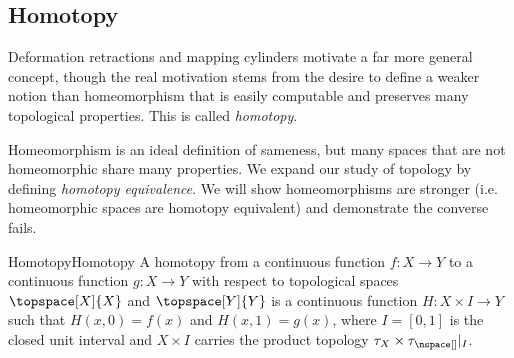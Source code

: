 \documentclass{book}                                                           %
\begin{document}
            \subsection{Homotopy}
                Deformation retractions and mapping cylinders motivate a far
                more general concept, though the real motivation stems from the
                desire to define a weaker notion than homeomorphism that is
                easily computable and preserves many topological properties.
                This is called \textit{homotopy}.
                \par\hfill\par
                \begin{minipage}{0.50\textwidth}
                    Homeomorphism is an ideal definition of sameness, but many
                    spaces that are not homeomorphic share many properties. We
                    expand our study of topology by defining
                    \textit{homotopy equivalence}. We will show homeomorphisms
                    are stronger (i.e. homeomorphic spaces are homotopy
                    equivalent) and demonstrate the converse fails.
                \end{minipage}
                \hfill
                \par\vspace{2.5ex}
                \begin{fdefinition}{Homotopy}{Homotopy}
                    A homotopy from a continuous function $f:X\rightarrow{Y}$ to
                    a continuous function $g:X\rightarrow{Y}$ with respect to
                    topological spaces $\topspace[X]{X}$ and $\topspace[Y]{Y}$
                    is a continuous function $H:{X}\times{I}\rightarrow{Y}$ such
                    that $H(x,0)=f(x)$ and $H(x,1)=g(x)$, where $I=[0,1]$ is the
                    closed unit interval and $X\times{I}$ carries the product
                    topology $\tau_{X}\times\tau_{\nspace[]}|_{I}$.
                \end{fdefinition}
\end{document}
